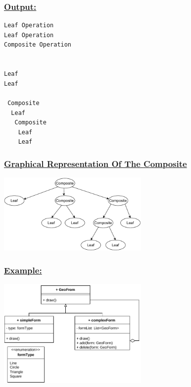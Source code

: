 




\subsubsection*{\underline{Output:}}
\begin{lstlisting}[style=cmd]
Leaf Operation
Leaf Operation
Composite Operation


Leaf
Leaf

 Composite
  Leaf
   Composite
    Leaf
    Leaf
\end{lstlisting}


\subsubsection*{\underline{Graphical Representation Of The Composite}}

\vspace{0.25cm}
\begin{center}
\includegraphics[width=0.55\textwidth,height=0.4\textheight]{Chapters/DesignPattern/Composite/tree.drawio.pdf}
\end{center}



\vspace{0.25cm}
\subsubsection*{\underline{Example:}}
\begin{center}
\includegraphics[width=0.55\textwidth,height=0.4\textheight]{Chapters/DesignPattern/Composite/comp2.drawio.pdf}
\end{center}

